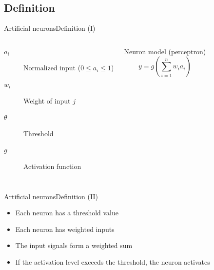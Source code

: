 \documentclass[10pt,compress]{beamer} %
\begin{document}
\subsection{Definition}

\begin{frame}{Artificial neurons}{Definition (I)}

    

	\bigskip
    \begin{columns}
		\begin{description}
		\item[$a_i$] Normalized input ($0 \le a_i \le 1$)
		\item[$w_{i}$] Weight of input $j$
		\item[$\theta$] Threshold
		\item[$g$] Activation function
		\end{description}

	   \begin{block}{Neuron model (perceptron)}
	   \vspace{-0.5cm}
	   \begin{equation*}
	   y=g\left( \sum_{i=1}^n w_{i} a_i \right)
	   \end{equation*}
	   \end{block}
    \end{columns}
\end{frame}

\begin{frame}{Artificial neurons}{Definition (II)}
	\begin{itemize}
	\item Each neuron has a threshold value
	\item Each neuron has weighted inputs
	\item The input signals form a weighted sum
	\item If the activation level exceeds the threshold, the neuron activates
	\end{itemize}
\end{frame}
\end{document}
